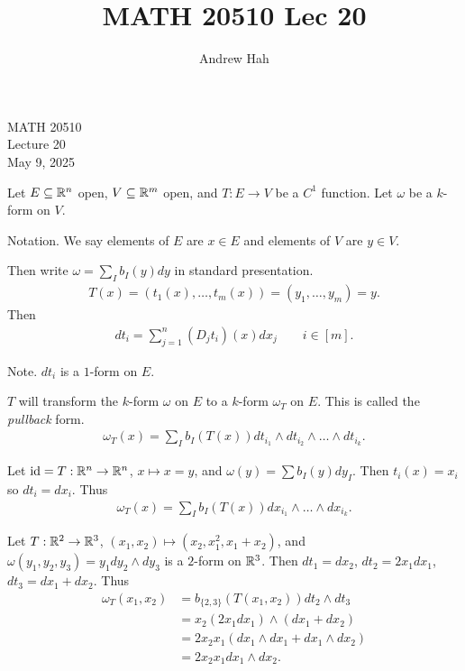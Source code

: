 \documentclass[11pt]{article}
\title{MATH 20510 Lec 20}
\author{Andrew Hah}
\begin{document}
\pagestyle{plain}
\begin{center}
{\Large MATH 20510} \\
{\Large Lecture 20} \\
\vspace{.2in}
May 9, 2025
\end{center}

Let $E \subseteq \mathbb{R}^n$ open, $V \subseteq \mathbb{R}^m$ open, and $T: E \to V$ be a $C^1$ function. Let $\omega$ be a $k$-form on $V$.

Notation. We say elements of $E$ are $x \in E$ and elements of $V$ are $y \in V$.

Then write $\omega = \sum_I b_I(y) dy$ in standard presentation. \begin{align*} T(x) = (t_1(x), \dots, t_m(x)) = (y_1, \dots, y_m) = y.
\end{align*} Then \begin{align*} dt_i = \sum_{j = 1}^n (D_j t_i )(x) dx_j \qquad i \in [m].
\end{align*}

Note. $dt_i$ is a $1$-form on $E$.

$T$ will transform the $k$-form $\omega$ on $E$ to a $k$-form $\omega_T$ on $E$. This is called the \emph{pullback} form. \begin{align*} \omega_T(x) = \sum_I b_I (T(x)) dt_{i_1} \wedge dt_{i_2} \wedge \dots \wedge dt_{i_k}.
\end{align*}

\begin{example} Let $\mathrm{id} = T: \mathbb{R}^n \to \mathbb{R}^n$, $x \mapsto x = y$, and $\omega(y) = \sum b_I(y) dy_I$. Then $t_i(x) = x_i$ so $dt_i = dx_i$. Thus \begin{align*} \omega_T(x) = \sum_I b_I (T(x)) dx_{i_1} \wedge \dots \wedge dx_{i_k}.
\end{align*}
\end{example}

\begin{example} Let $T: \mathbb{R}^2 \to \mathbb{R}^3$, $(x_1, x_2) \mapsto (x_2, x_1^2, x_1 + x_2)$, and $\omega(y_1, y_2, y_3) = y_1 dy_2 \wedge dy_3$ is a $2$-form on $\mathbb{R}^3$. Then $dt_1 = dx_2$, $dt_2 = 2x_1 dx_1$, $dt_3 = dx_1 + dx_2$. Thus \begin{align*} \omega_T(x_1, x_2) & = b_{\{ 2, 3 \}} (T(x_1, x_2)) dt_2 \wedge dt_3 \\ & = x_2 (2x_1 dx_1) \wedge (dx_1 + dx_2) \\ & = 2 x_2 x_1 (dx_1 \wedge dx_1 + dx_1 \wedge dx_2) \\ & = 2x_2 x_1 dx_1 \wedge dx_2.
\end{align*}
\end{example}
\end{document}
